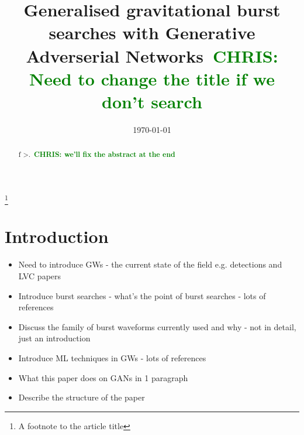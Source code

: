 \documentclass[%
 reprint,
 amsmath,amssymb,
 aps,
]{revtex4-2}
\newcommand{\chris}[1]{\textbf{\textcolor{green}{CHRIS: #1}}}
\begin{document}

\title{Generalised gravitational burst searches with Generative Adverserial
Networks~\chris{Need to change the title if we don't search}}%
\thanks{A footnote to the article title}%


 \email{}
%


\date{\today}%

\begin{abstract}
f >.~\chris{we'll
fix the abstract at the end}
\end{abstract}

\maketitle


\section{Introduction}

\begin{itemize}
\item Need to introduce GWs - the current state of the field e.g. detections
and LVC papers
\item Introduce burst searches - what's the point of burst searches - lots of references
\item Discuss the family of burst waveforms currently used and why - not in detail, just
an introduction
\item Introduce ML techniques in GWs - lots of references
\item What this paper does on GANs in 1 paragraph
\item Describe the structure of the paper 
\end{itemize}
\end{document}
